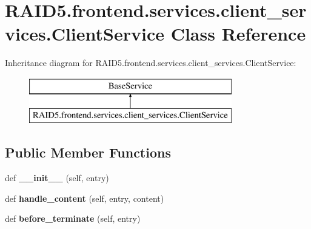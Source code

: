 \hypertarget{class_r_a_i_d5_1_1frontend_1_1services_1_1client__services_1_1_client_service}{}\section{R\+A\+I\+D5.\+frontend.\+services.\+client\+\_\+services.\+Client\+Service Class Reference}
\label{class_r_a_i_d5_1_1frontend_1_1services_1_1client__services_1_1_client_service}
Inheritance diagram for R\+A\+I\+D5.\+frontend.\+services.\+client\+\_\+services.\+Client\+Service\+:\begin{figure}[H]
\begin{center}
\leavevmode
\includegraphics[height=2.000000cm]{class_r_a_i_d5_1_1frontend_1_1services_1_1client__services_1_1_client_service}
\end{center}
\end{figure}
\subsection*{Public Member Functions}
\begin{DoxyCompactItemize}
\item 
\mbox{\label{class_r_a_i_d5_1_1frontend_1_1services_1_1client__services_1_1_client_service_a8f006fd47ed59eb687f4e23cd7cf1850}} 
def {\bfseries \+\_\+\+\_\+init\+\_\+\+\_\+} (self, entry)
\item 
\mbox{\label{class_r_a_i_d5_1_1frontend_1_1services_1_1client__services_1_1_client_service_a86cd6e3f4af08083be74465aaf11e89a}} 
def {\bfseries handle\+\_\+content} (self, entry, content)
\item 
\mbox{\label{class_r_a_i_d5_1_1frontend_1_1services_1_1client__services_1_1_client_service_a460750a7548083eb5907d78c54f41452}} 
def {\bfseries before\+\_\+terminate} (self, entry)
\end{DoxyCompactItemize}

